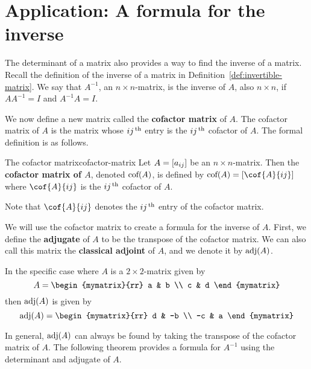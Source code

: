 \section{Application: A formula for the inverse}

The determinant of a matrix also provides a way to find the inverse of a matrix.
Recall the definition of the inverse of a matrix in Definition~\ref{def:invertible-matrix}.
We say that $A^{-1}$, an $n \times n$-matrix, is the inverse of $A$, also $n \times n$, if $AA^{-1} = I$ and $A^{-1}A=I$. 

We now define a new matrix called the \textbf{cofactor matrix} of $A$.  
The cofactor matrix of $A$ is the matrix whose $ij^{\,\rm th}$ entry is the $ij^{\,\rm th}$ cofactor of $A$.
The formal definition is as follows.

\begin{definition}{The cofactor matrix}{cofactor-matrix}
Let $A=\left[a_{ij}\right]$ be an $n\times n$-matrix. Then the
\textbf{cofactor matrix of $A$}, denoted 
$\mbox{\rm cof}(A)$, is defined by $\func{cof}(A) =\mat{
\cof{A}{ij}} $ where  $\cof{A}{ij}$ is the $ij^{\,\rm th}$ cofactor of $A$.
\end{definition}

Note that $\cof{A}{ij}$ denotes the $ij^{\,\rm th}$ entry of the cofactor matrix.

We will use the cofactor matrix to create a formula for the inverse of $A$. First,
we define the \textbf{adjugate} of $A$ to be the transpose of 
the cofactor matrix. We can also call this matrix the \textbf{classical adjoint} of $A$,
and we denote it by $\mbox{\rm adj} (A)$. 

In the specific case where $A$ is a $2 \times 2$-matrix given by
\begin{equation*}
A = \begin{mymatrix}{rr}
a & b \\
c & d
\end{mymatrix}
\end{equation*}
then $\mbox{\rm adj}(A)$ is given by
\begin{equation*}
\func{adj}(A) = 
\begin{mymatrix}{rr}
d & -b \\
-c & a
\end{mymatrix}
\end{equation*}

In general, $\mbox{\rm adj}(A)$ can always be found by taking the transpose of the cofactor matrix of $A$. The following theorem provides a formula for $A^{-1}$ using the determinant and adjugate of $A$.

